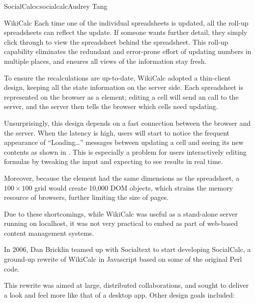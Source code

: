 \begin{aosachapter}{SocialCalc}{s:socialcalc}{Audrey Tang}
\begin{aosasect1}{WikiCalc}
Each time one of the individual spreadsheets is updated, all the
roll-up spreadsheets can reflect the update.  If someone wants further
detail, they simply click through to view the spreadsheet behind the
spreadsheet.  This roll-up capability eliminates the redundant and
error-prone effort of updating numbers in multiple places, and ensures
all views of the information stay fresh.

To ensure the recalculations are up-to-date, WikiCalc adopted a
thin-client design, keeping all the state information on the server
side.  Each spreadsheet is represented on the browser as a
 element; editing a cell will
send an  call to the server, and the server then
tells the browser which cells need updating.

Unsurprisingly, this design depends on a fast connection between the
browser and the server.  When the latency is high, users will start to
notice the frequent appearance of ``Loading\ldots'' messages between
updating a cell and seeing its new contents as shown in
. This is especially a problem for users
interactively editing formulas by tweaking the input and expecting to
see results in real time.


Moreover, because the  element
had the same dimensions as the spreadsheet, a $100{\times}100$ grid
would create 10,000  DOM objects,
which strains the memory resource of browsers, further limiting the
size of pages.

Due to these shortcomings, while WikiCalc was useful as a stand-alone
server running on localhost, it was not very practical to embed as part
of web-based content management systems.

In 2006, Dan Bricklin teamed up with Socialtext to start developing
SocialCalc, a ground-up rewrite of WikiCalc in Javascript based on
some of the original Perl code.

This rewrite was aimed at large, distributed collaborations, and sought
to deliver a look and feel more like that of a desktop app.  Other design
goals included:

\begin{aosaitemize}


\end{aosaitemize}
\end{aosasect1}
\end{aosachapter}
